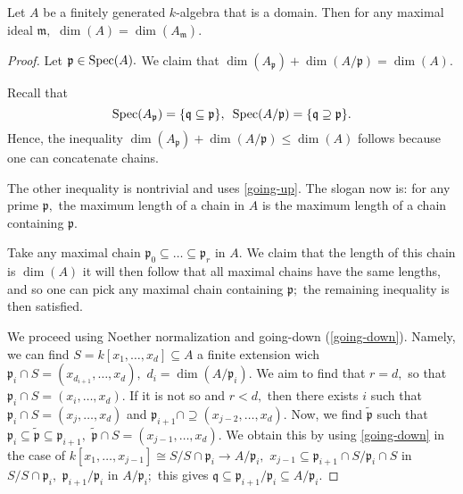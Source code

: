 \begin{theorem}
  \label{domain dimension}
  Let \(A\) be a finitely generated \(k\)-algebra that is a domain. Then for any maximal ideal \(\mathfrak{m},\) \(\dim(A) = \dim(A_{\mathfrak{m}}).\)
\end{theorem}
\begin{proof}
  Let \(\mathfrak{p}\in \text{Spec}(A).\) We claim that
  \(\dim (A_{\mathfrak{p}}) + \dim(A/{\mathfrak{p}}) = \dim(A).\)

  Recall that
  \[\text{Spec}(A_{\mathfrak{p}}) = \{\mathfrak{q} \subseteq \mathfrak{p}\}, \enspace\text{Spec}(A/{\mathfrak{p}}) = \{\mathfrak{q} \supseteq \mathfrak{p}\}.\]
  Hence, the inequality
  \(\dim(A_{\mathfrak{p}}) + \dim(A/{\mathfrak{p}}) \leq \dim(A)\)
  follows because one can concatenate chains.

  The other inequality is nontrivial and uses \cref{going-up}. The slogan now is: for any prime \(\mathfrak{p},\) the maximum length of a chain in \(A\) is the maximum length of a chain containing \(\mathfrak{p}.\)

  Take any maximal chain \(\mathfrak{p}_0 \subseteq \dotso \subseteq \mathfrak{p}_r\) in \(A.\) We claim that the length of this chain is \(\dim(A)\) it will then follow that all maximal chains have the same lengths, and so one can pick any maximal chain containing \(\mathfrak{p};\) the remaining inequality is then satisfied.

  We proceed using Noether normalization and going-down (\cref{going-down}). Namely, we can find \(S = k[x_1, \dotsc, x_d] \subseteq A\) a finite extension wich \(\mathfrak{p}_i \cap S = (x_{d_{i+1}}, \dotsc, x_d),\) \(d_i = \dim(A/{\mathfrak{p}_i}).\)
  We aim to find that \(r = d,\) so that \(\mathfrak{p}_i \cap S = (x_i, \dotsc, x_d).\)
  If it is not so and \(r < d,\) then there exists \(i\) such that
  \(\mathfrak{p}_i \cap S = (x_j, \dotsc, x_d)\)
  and
  \(\mathfrak{p}_{i+1} \cap \supseteq (x_{j-2}, \dotsc, x_d).\)
  Now, we find \(\tilde{\mathfrak{p}}\) such that \(\mathfrak{p}_i \subseteq \tilde{\mathfrak{p}} \subseteq \mathfrak{p}_{i+1},\) \(\tilde{\mathfrak{p}} \cap S = (x_{j-1}, \dotsc, x_d).\)
  We obtain this by using \cref{going-down} in the case of
  \(k[x_1, \dotsc, x_{j-1}] \cong S/{S \cap \mathfrak{p}_i} \to A/{\mathfrak{p}_i},\)
  \(x_{j-1} \subseteq \mathfrak{p}_{i+1} \cap S /{\mathfrak{p}_i \cap S}\) in \(S/{S \cap \mathfrak{p}_i},\)
  \(\mathfrak{p}_{i+1}/{\mathfrak{p}_i}\) in \(A/{\mathfrak{p}_i};\) this gives
  \(\mathfrak{q} \subseteq \mathfrak{p}_{i+1}/{\mathfrak{p}_i} \subseteq A/{\mathfrak{p}_i}.\)
\end{proof}


